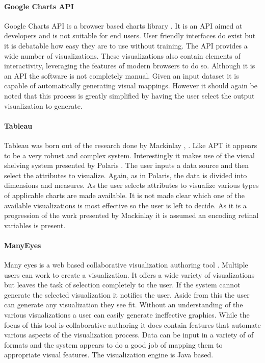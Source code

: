 \documentclass[a4paper, 11pt, titlepage, onehalfspacing]{report}
\begin{document}
\paragraph{Google Charts API}
Google Charts API is a browser based charts library \cite{gcharts}. It is an API aimed at developers and is not suitable for end users. User friendly interfaces do exist \cite{hohli} but it is debatable how easy they are to use without training. The API provides a wide number of visualizations. These visualizations also contain elements of interactivity, leveraging the features of modern browsers to do so. Although it is an API the software is not completely manual. Given an input dataset it is capable of automatically generating visual mappings. However it should again be noted that this process is greatly simplified by having the user select the output visualization to generate. 

\paragraph{Tableau}
Tableau was born out of the research done by Mackinlay \cite{tableau}, \cite{mackinlay1986automating}. Like APT it appears to be a very robust and complex system. Interestingly it makes use of the visual shelving system presented by Polaris \cite{stolte2002polaris}. The user inputs a data source and then select the attributes to visualize. Again, as in Polaris, the data is divided into dimensions and measures. As the user selects attributes to visualize various types of applicable charts are made available. It is not made clear which one of the available visualizations is most effective so the user is left to decide. As it is a progression of the work presented by Mackinlay it is assumed an encoding retinal variables is present.

\paragraph{ManyEyes}
Many eyes is a web based collaborative visualization authoring tool \cite{manyeyes}. Multiple users can work to create a visualization. It offers a wide variety of visualizations but leaves the task of selection completely to the user. If the system cannot generate the selected visualization it notifies the user. Aside from this the user can generate any visualization they see fit. Without an understanding of the various visualizations a user can easily generate ineffective graphics. While the focus of this tool is collaborative authoring it does contain features that automate various aspects of the visualization process. Data can be input in a variety of of formats and the system appears to do a good job of mapping them to appropriate visual features. The visualization engine is Java based.
\end{document}

